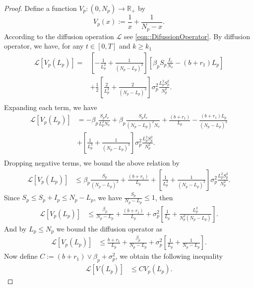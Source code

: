 \begin{proof}
		Define a function $V_p:(0,N_p)\rightarrow \mathbb{R}_+$ by
%	
	\begin{equation*}
		V_p(x) := 
			\frac{1}{x} + 
			\frac{1}{N_p-x}.
	\end{equation*}
%	
	According to the diffusion operation $\mathcal{L}$
	see \autoref{eqn::DifussionOperator}. By diffusion operator, we have, for any 
	$t\in [0,T]$ and $k\geq k_1$ 
%
	\begin{align*}
		\mathcal{L}[V_p(L_p)] 
			=&	
				\left[
					-\frac{1}{L_p^2} + 
					\frac{1}{(N_p - L_p) ^ 2}
				\right]
				\left[
					\beta_p S_p 
					\frac{I_v}{N_v} - 
					(b + r_1) L_p\right]
				\\
			&+
				\frac{1}{2}
				\left[
					\frac{2}{L_p^3} + 
					\frac{2}{(N_p - L_p)^3}
				\right]
				\sigma_p ^ 2
				\frac{L_p^2 S_p^2}{N_p^2}.
			\\
	\end{align*}
%	
	Expanding each term, we have
	\begin{align*}
		\mathcal{L}[V_p(L_p)] 
			&=	
				-\beta_p \frac{S_p I_v}{L_p^2 N_v} + 
				\beta_p \frac{S_p I_v}{(N_p -L_p) ^ 2 N_v} + 
				\frac{(b + r_1)}{L_p} - 
				\frac{(b+r_1)L_p}{(N_p-L_p)^2}
				\\
			&+
				\left[
					\frac{1}{L_p^3} + 
					\frac{1}{(N_p-L_p)^3}
				\right]
				\sigma_p ^ 2
				\frac{L_p^2 S_p^2}{N_p^2}.
				\\
	\end{align*}
%	
	Dropping negative terms, we bound the above relation by
	\begin{align*}
		\mathcal{L}[V_p(L_p)] 
			&\leq	
				\beta_p 
				\frac{S_p}{(N_p - L_p) ^ 2} + 
				\frac{(b + r_1)}{L_p} + 
				\left[
					\frac{1}{L_p^3} + 
					\frac{1}{(N_p-L_p)^3}
				\right]
				\sigma_p ^ 2
				\frac{L_p ^ 2 S_p ^ 2}{N_p ^ 2}.
	\end{align*}
	Since $S_p\leq S_p+I_p\leq N_p-L_p$, we have $\frac{S_p}{N_p-L_p}\leq 1$, then
	\begin{align*}
		\mathcal{L}[V_p(L_p)] 
			&\leq		
				\frac{\beta_p}{N_p -L_p} + 
				\frac{(b + r_1)}{L_p} + 
				\sigma_p^2
				\left[
					\frac{1}{L_p} + 
					\frac{L_p^2}{N_p^2(N_p-L_p)}
				\right].
	\end{align*}
	And by $L_p\leq N_p$ we bound the diffusion operator as
	\begin{align*}
		\mathcal{L}[V_p(L_p)] 
			&\leq		
			\frac{b+r_1}{L_p} + 
			\frac{\beta_p}{N_p -L_p} +  
			\sigma_p^2
			\left[
				\frac{1}{L_p} + 
				\frac{1}{N_p-L_p}
			\right].
	\end{align*}
	Now define $C := (b+r_1) \vee \beta_p +\sigma_p^2$, we obtain the 
	following inequality
	\begin{align}\label{eqn::BoundDiffusionOperator}
		\mathcal{L}[V(L_p)] 
			&\leq		
				C V_p(L_p).
	\end{align}
	

\end{proof}
